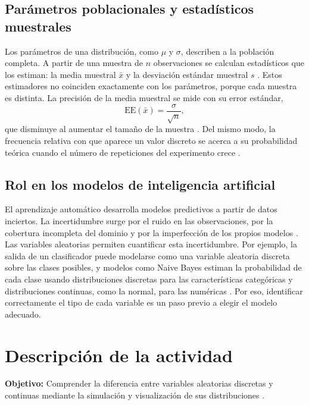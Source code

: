 \documentclass[11pt,letterpaper]{article}
\begin{document}
\subsection{Parámetros poblacionales y estadísticos muestrales}

Los parámetros de una distribución, como $\mu$ y $\sigma$, describen a la población completa. A partir de una muestra de $n$ observaciones se calculan estadísticos que los estiman: la media muestral $\bar{x}$ y la desviación estándar muestral $s$ \parencite{bonamente2017}. Estos estimadores no coinciden exactamente con los parámetros, porque cada muestra es distinta. La precisión de la media muestral se mide con su error estándar,
\begin{equation}
    \text{EE}(\bar{x}) = \frac{\sigma}{\sqrt{n}},
\end{equation}
que disminuye al aumentar el tamaño de la muestra \parencite{bruce2020}. Del mismo modo, la frecuencia relativa con que aparece un valor discreto se acerca a su probabilidad teórica cuando el número de repeticiones del experimento crece \parencite{bonamente2017}.

\subsection{Rol en los modelos de inteligencia artificial}

El aprendizaje automático desarrolla modelos predictivos a partir de datos inciertos. La incertidumbre surge por el ruido en las observaciones, por la cobertura incompleta del dominio y por la imperfección de los propios modelos \parencite{tecnm2026_documento_fuente,brownlee2020}. Las variables aleatorias permiten cuantificar esta incertidumbre. Por ejemplo, la salida de un clasificador puede modelarse como una variable aleatoria discreta sobre las clases posibles, y modelos como Naive Bayes estiman la probabilidad de cada clase usando distribuciones discretas para las características categóricas y distribuciones continuas, como la normal, para las numéricas \parencite{tecnm2026_documento_fuente}. Por eso, identificar correctamente el tipo de cada variable es un paso previo a elegir el modelo adecuado.

\section{Descripción de la actividad}

\textbf{Objetivo:} Comprender la diferencia entre variables aleatorias discretas y continuas mediante la simulación y visualización de sus distribuciones \parencite{tecnm2026_documento_fuente}.
\end{document}
